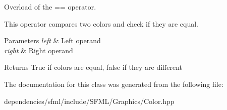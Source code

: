 Overload of the == operator. 

This operator compares two colors and check if they are equal.


\begin{DoxyParams}{Parameters}
{\em left} & Left operand \\
\hline
{\em right} & Right operand\\
\hline
\end{DoxyParams}
\begin{DoxyReturn}{Returns}
True if colors are equal, false if they are different 
\end{DoxyReturn}


The documentation for this class was generated from the following file\+:\begin{DoxyCompactItemize}
\item 
dependencies/sfml/include/\+S\+F\+M\+L/\+Graphics/Color.\+hpp\end{DoxyCompactItemize}
